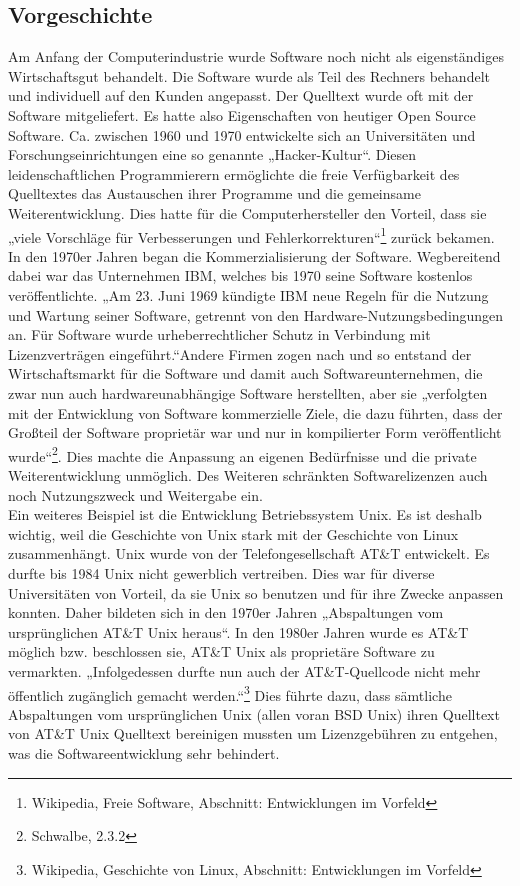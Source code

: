 \documentclass[a4paper,12pt]{article}
\begin{document}
\subsection{Vorgeschichte}
Am Anfang der Computerindustrie wurde Software noch nicht als eigenständiges Wirtschaftsgut behandelt. Die Software wurde als Teil des Rechners behandelt und individuell auf den Kunden angepasst. Der Quelltext wurde oft mit der Software mitgeliefert. Es hatte also Eigenschaften von heutiger Open Source Software. Ca. zwischen 1960 und 1970 entwickelte sich an Universitäten und Forschungseinrichtungen eine so genannte „Hacker-Kultur“. Diesen leidenschaftlichen Programmierern ermöglichte die freie Verfügbarkeit des Quelltextes das Austauschen ihrer Programme und die gemeinsame Weiterentwicklung. Dies hatte für die Computerhersteller den Vorteil, dass sie „viele Vorschläge für Verbesserungen und Fehlerkorrekturen“\footnote{Wikipedia, Freie Software, Abschnitt: Entwicklungen im Vorfeld} zurück bekamen.\\
In den 1970er Jahren began die Kommerzialisierung der Software. Wegbereitend dabei war das Unternehmen IBM, welches bis 1970 seine Software kostenlos veröffentlichte. „Am 23. Juni 1969 kündigte IBM neue Regeln für die Nutzung und Wartung seiner Software, getrennt von den Hardware-Nutzungsbedingungen an. Für Software wurde urheberrechtlicher Schutz in Verbindung mit Lizenzverträgen eingeführt.“\footnotemark[8] Andere Firmen zogen nach und so entstand der Wirtschaftsmarkt für die Software und damit auch Softwareunternehmen, die zwar nun auch hardwareunabhängige Software herstellten, aber sie „verfolgten mit der Entwicklung von Software kommerzielle Ziele, die dazu führten, dass der Großteil der Software proprietär war und nur in kompilierter Form veröffentlicht wurde“\footnote{Schwalbe, 2.3.2}. Dies machte die Anpassung an eigenen Bedürfnisse und die private Weiterentwicklung unmöglich. Des Weiteren schränkten Softwarelizenzen auch noch Nutzungszweck und Weitergabe ein.\\
Ein weiteres Beispiel ist die Entwicklung Betriebssystem Unix. Es ist deshalb wichtig, weil die Geschichte von Unix stark mit der Geschichte von Linux zusammenhängt. Unix wurde von der Telefongesellschaft AT\&T entwickelt. Es durfte bis 1984 Unix nicht gewerblich vertreiben. Dies war für diverse Universitäten von Vorteil, da sie Unix so benutzen und für ihre Zwecke anpassen konnten. Daher bildeten sich in den 1970er Jahren „Abspaltungen vom ursprünglichen AT\&T Unix heraus“\footnotemark[9]. In den 1980er Jahren wurde es AT\&T möglich bzw. beschlossen sie, AT\&T Unix als proprietäre Software zu vermarkten. „Infolgedessen durfte nun auch der AT\&T-Quellcode nicht mehr öffentlich zugänglich gemacht werden.“\footnote{Wikipedia, Geschichte von Linux, Abschnitt: Entwicklungen im Vorfeld} Dies führte dazu, dass sämtliche Abspaltungen vom ursprünglichen Unix (allen voran BSD Unix) ihren Quelltext von AT\&T Unix Quelltext bereinigen mussten um Lizenzgebühren zu entgehen, was die Softwareentwicklung sehr behindert.
\end{document}
